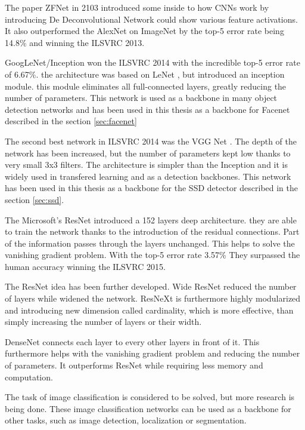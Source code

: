 \documentclass[a4paper,12pt,titlepage, twoside]{article}
\numberwithin{figure}{section}
\begin{document}
The paper ZFNet \cite{zeiler2014visualizing} in 2103 introduced some inside to how CNNs work by introducing De Deconvolutional Network could show various feature activations. It also outperformed the AlexNet on ImageNet by the top-5 error rate being 14.8\% and winning the ILSVRC 2013.

GoogLeNet/Inception won the ILSVRC 2014 with the incredible top-5 error rate of 6.67\%. the architecture was based on LeNet \cite{lecun1998gradient}, but introduced an inception module. this module eliminates all full-connected layers, greatly reducing the number of parameters. This network is used as a backbone in many object detection networks and has been used in this thesis as a backbone for Facenet \cite{schroff2015facenet} described in the section \ref{sec:facenet}

The second best network in ILSVRC 2014 was the VGG Net \cite{simonyan2014very}. The depth of the network has been increased, but the number of parameters kept low thanks to very small 3x3 filters. The architecture is simpler than the Inception and it is widely used in transfered learning and as a detection backbones. This network has been used in this thesis as a backbone for the SSD detector \cite{liu2016ssd} described in the section \ref{sec:ssd}. 

The Microsoft's ResNet \cite{he2016deep} introduced a 152 layers deep architecture. they are able to train the network thanks to the introduction of the residual connections. Part of the information passes through the layers unchanged. This helps to solve the vanishing gradient problem. With the top-5 error rate 3.57\% They surpassed the human accuracy winning the ILSVRC 2015.

The ResNet idea has been further developed. Wide ResNet \cite{zagoruyko2016wide} reduced the number of layers while widened the network. ResNeXt \cite{xie2017aggregated} is furthermore highly modularized and introducing new dimension called cardinality, which is more effective, than simply increasing the number of layers or their width. 

DenseNet \cite{huang2017densely} connects each layer to every other layers in front of it. This furthermore helps with the vanishing gradient problem and reducing the number of parameters. It outperforms ResNet while requiring less memory and computation.

The task of image classification is considered to be solved, but more research is being done. These image classification networks can be used as a backbone for other tasks, such as image detection, localization or segmentation.
\end{document}
